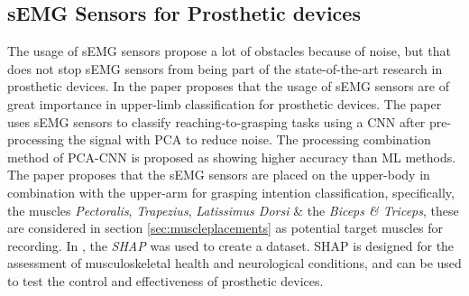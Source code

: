 \documentclass[../main.tex]{subfiles}
\begin{document}
\subsection{sEMG Sensors for Prosthetic devices}

The usage of sEMG sensors propose a lot of obstacles because of noise, but that does not stop sEMG sensors from being part of the state-of-the-art research in prosthetic devices.
In the paper \cite{KeunTaeKim2021} proposes that the usage of sEMG sensors are of great importance in upper-limb classification for prosthetic devices.
The paper uses sEMG sensors to classify reaching-to-grasping tasks using a \gls{CNN} after pre-processing the signal with \gls{PCA} to reduce noise.
The processing combination method of PCA-CNN is proposed as showing higher accuracy than \gls{ML} methods.
The paper proposes that the sEMG sensors are placed on the upper-body in combination with the upper-arm for grasping intention classification, specifically, the muscles \textit{Pectoralis}, \textit{Trapezius}, \textit{Latissimus Dorsi} \& the \textit{Biceps \& Triceps}, these are considered in section \ref{sec:muscleplacements} as potential target muscles for recording.
In \cite{KeunTaeKim2021}, the \textit{\gls{SHAP}} \cite{shap} was used to create a dataset.
\gls{SHAP} is designed for the assessment of musculoskeletal health and neurological conditions, and can be used to test the control and effectiveness of prosthetic devices.
\end{document}
